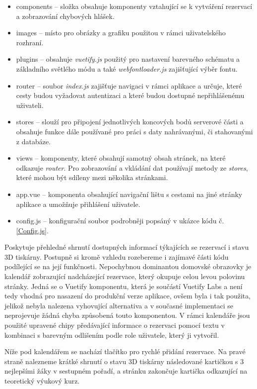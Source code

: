 \documentclass[twoside, 12pt]{article}
\begin{document}
\begin{itemize}
    \item components -- složka obsahuje komponenty vztahující se k vytváření rezervací a zobrazování chybových hlášek.
    \item images -- místo pro obrázky a grafiku použitou v rámci uživatelského rozhraní.
    \item plugins -- obsahuje \textit{vuetify.js} použitý pro nastavení barevného schématu a základního světlého módu a také \textit{webfontloader.js} zajišťující výběr fontu.
    \item router -- soubor \textit{index.js} zajišťuje navigaci v rámci aplikace a určuje, které cesty budou vyžadovat autentizaci a které budou dostupné nepřihlášenému uživateli.
    \item stores -- slouží pro připojení jednotlivých koncových bodů serverové části a obsahuje funkce dále používané pro práci s daty nahrávanými, či stahovanými z databáze.
    \item views -- komponenty, které obsahují samotný obsah stránek, na které odkazuje \textit{router}. Pro zobrazování a vkládání dat používají metody ze \textit{stores}, které mohou být sdíleny mezi několika stránkami.
    \item app.vue -- komponenta obsahující navigační lištu s cestami na jiné stránky aplikace a umožňuje přihlášení uživatele.
    \item config.js -- konfigurační soubor podrobněji popsáný v ukázce kódu č. \ref{Config.js}.
\end{itemize}



Poskytuje přehledné shrnutí dostupných informací týkajících se rezervací i stavu 3D tiskárny. Postupně si kromě vzhledu rozebereme i zajímavé části kódu podílející se na její funkčnosti. Nepochybnou dominantou domovské obrazovky je kalendář zobrazující nadcházející rezervace, který okupuje celou levou polovinu stránky. Jedná se o Vuetify komponentu, která je součástí Vuetify Labs a není tedy vhodná pro nasazení do produkční verze aplikace, ovšem byla i tak použita, jelikož nebyla nalezena vyhovující alternativa a v současné implementaci se neprojevuje žádná chyba způsobená touto komponentou. V rámci kalendáře jsou použité upravené chipy předávající informace o rezervaci pomocí textu v kombinaci s barevným odlišením podle role uživatele, který ji vytvořil.

Níže pod kalendářem se nachází tlačítko pro rychlé přidání rezervace. Na pravé straně nalezneme krátké shrnutí o stavu 3D tiskárny následované kartičkou s 3 nejlepšími žáky v sestupném pořadí, a stránku zakončuje kartička odkazující na teoretický výukový kurz.
\end{document}
